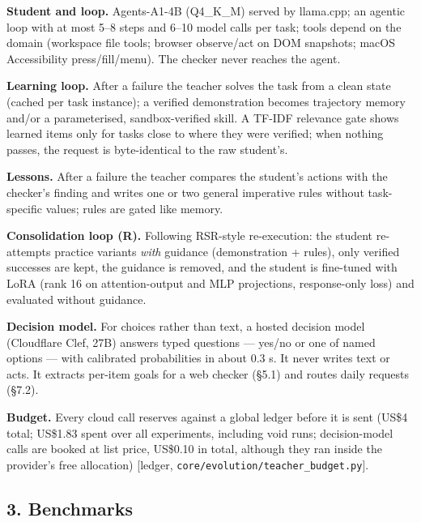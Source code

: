 \documentclass[
  10pt,
]{article}
\begin{document}
\textbf{Student and loop.} Agents-A1-4B (Q4\_K\_M) served by llama.cpp;
an agentic loop with at most 5--8 steps and 6--10 model calls per task;
tools depend on the domain (workspace file tools; browser observe/act on
DOM snapshots; macOS Accessibility press/fill/menu). The checker never
reaches the agent.

\textbf{Learning loop.} After a failure the teacher solves the task from
a clean state (cached per task instance); a verified demonstration
becomes trajectory memory and/or a parameterised, sandbox-verified
skill. A TF-IDF relevance gate shows learned items only for tasks close
to where they were verified; when nothing passes, the request is
byte-identical to the raw student's.

\textbf{Lessons.} After a failure the teacher compares the student's
actions with the checker's finding and writes one or two general
imperative rules without task-specific values; rules are gated like
memory.

\textbf{Consolidation loop (R).} Following RSR-style re-execution: the
student re-attempts practice variants \emph{with} guidance
(demonstration + rules), only verified successes are kept, the guidance
is removed, and the student is fine-tuned with LoRA (rank 16 on
attention-output and MLP projections, response-only loss) and evaluated
without guidance.

\textbf{Decision model.} For choices rather than text, a hosted decision
model (Cloudflare Clef, 27B) answers typed questions --- yes/no or one
of named options --- with calibrated probabilities in about 0.3 s. It
never writes text or acts. It extracts per-item goals for a web checker
(§5.1) and routes daily requests (§7.2).

\textbf{Budget.} Every cloud call reserves against a global ledger
before it is sent (US\$4 total; US\$1.83 spent over all experiments,
including void runs; decision-model calls are booked at list price,
US\$0.10 in total, although they ran inside the provider's free
allocation) {[}ledger, \texttt{core/evolution/teacher\_budget.py}{]}.

\subsection{3. Benchmarks}\label{benchmarks}
\end{document}
